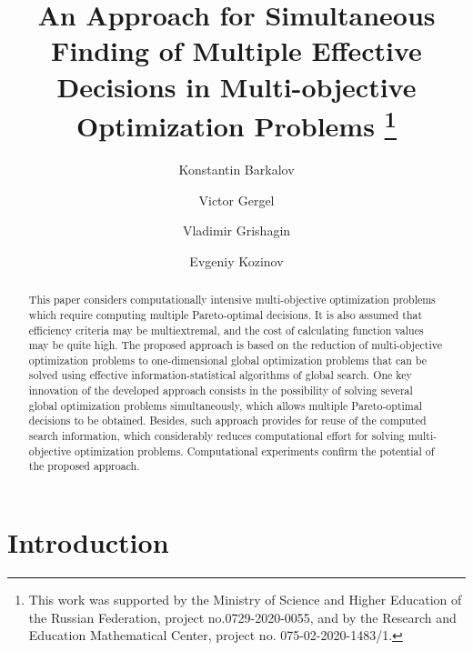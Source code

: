 \documentclass[runningheads]{llncs}
\begin{document}
%
\title{An Approach for Simultaneous Finding of Multiple Effective Decisions in Multi-objective Optimization Problems
\thanks{This work was supported by the Ministry of Science and Higher Education of the Russian Federation, project no.0729-2020-0055, and by the Research and Education Mathematical Center, project no. 075-02-2020-1483/1.}}
%
%
\author{Konstantin Barkalov \and
Victor Gergel \and
Vladimir Grishagin \and
Evgeniy Kozinov 
}
%
%
%
\maketitle              %
%
\begin{abstract}
This paper considers computationally intensive multi-objective optimization problems which require computing multiple Pareto-optimal decisions. It is also assumed that efficiency criteria may be multiextremal, and the cost of calculating function values may be quite high. The proposed approach is based on the reduction of multi-objective optimization problems to one-dimensional global optimization problems that can be solved using effective information-statistical algorithms of global search. One key innovation of the developed approach consists in the possibility of solving several global optimization problems simultaneously, which allows multiple Pareto-optimal decisions to be obtained. Besides, such approach provides for reuse of the computed search information, which considerably reduces computational effort for solving multi-objective optimization problems. Computational experiments confirm the potential of the proposed approach.

\end{abstract}
%
%
%
\section{Introduction} \label{sec:01}
\end{document}
